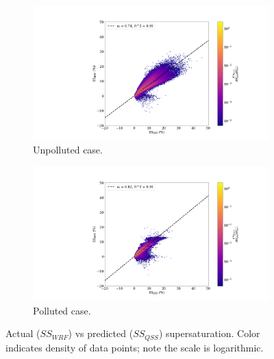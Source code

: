 \documentclass{article}
\begin{document}
\begin{figure}[ht]
	\centering
	\begin{subfigure}{0.7\textwidth}
		\includegraphics[width=\textwidth]{revmywrf/v12_heatmap_ss_qss_vs_ss_wrf_Unpolluted_figure_6.png}
		\caption{Unpolluted case.}
		\label{wrfvsqssunpoll}
	\end{subfigure}
	\begin{subfigure}{0.7\textwidth}
		\includegraphics[width=\textwidth]{revmywrf/v12_heatmap_ss_qss_vs_ss_wrf_Polluted_figure_6.png}
		\caption{Polluted case.}
		\label{wrfvsqsspoll}
	\end{subfigure}
	\caption{Actual ($SS_{WRF}$) vs predicted ($SS_{QSS}$) supersaturation. Color indicates density of data points; note the scale is logarithmic.}
	\label{wrfvsqss}
\end{figure}
\end{document}
